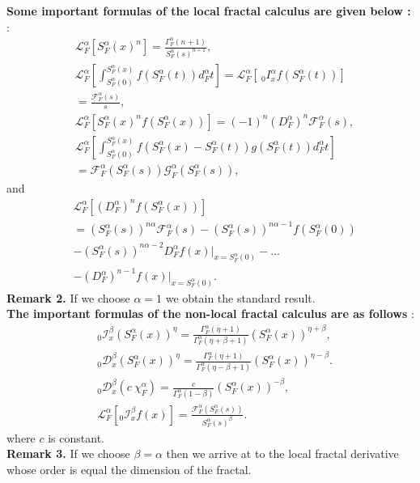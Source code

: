 \documentclass[12pt]{article}
\begin{document}
\textbf{Some important formulas of the local fractal calculus are given below :} \cite{ab12,Golmankhaneh-107-k}:
\begin{align}
& \mathcal{L}_{F}^{\alpha}[S_{F}^{\alpha}(x)^n ]= \frac{\Gamma_{F}^{\alpha}(n+1)}{S_{F}^{\alpha}(s)^{n+1}},\nonumber\\&
\mathcal{L}_{F}^{\alpha}\left[\int_{S_{F}^{\alpha}(0)}^{S_{F}^{\alpha}(x)}f(S_{F}^{\alpha}(t))d_{F}^{\alpha}t\right]=\mathcal{L}_{F}^{\alpha}
\left[~_{0}I_{x}^{\alpha}f(S_{F}^{\alpha}(t))\right]\nonumber\\& = \frac{\mathcal{F}_{F}^{\alpha}(s)}{s},\nonumber\\&
 \mathcal{L}_{F}^{\alpha}[S_{F}^{\alpha}(x)^n f(S_{F}^{\alpha}(x))]=(-1)^{n}(D_{F}^{\alpha})^{n}\mathcal{F}_{F}^{\alpha}(s),\nonumber\\&
 \mathcal{L}_{F}^{\alpha}\left[\int_{S_{F}^{\alpha}(0)}^{S_{F}^{\alpha}(x)}f(S_{F}^{\alpha}(x)-S_{F}^{\alpha}(t))g(S_{F}^{\alpha}(t))d_{F}^{\alpha}t\right]\nonumber\\&=
\mathcal{F}_{F}^{\alpha}(S_{F}^{\alpha}(s)) \mathcal{G}_{F}^{\alpha}(S_{F}^{\alpha}(s)),
\end{align}
and
 \begin{align}\label{vcxzd}
  & \mathcal{L}_{F}^{\alpha}[(D_{F}^{\alpha})^{n}f(S_{F}^{\alpha}(x))]\nonumber\\& = (S_{F}^{\alpha}(s))^{n\alpha}
\mathcal{F}_{F}^{\alpha}(s)-(S_{F}^{\alpha}(s))^{n\alpha-1}f(S_{F}^{\alpha}(0))\nonumber\\&-
(S_{F}^{\alpha}(s))^{n\alpha-2}D_{F}^{\alpha}f(x)|_{x=S_{F}^{\alpha}(0)}-\ldots\nonumber\\&-(D_{F}^{\alpha})^{n-1}f(x)|_{x=S_{F}^{\alpha}(0)}.
 \end{align}
 \textbf{Remark 2.} If we choose  $\alpha=1$ we obtain the standard result.\\
\textbf{The important formulas of the non-local fractal calculus are as follows } \cite{Golmankhaneh-107-k}:
\begin{align}
&  _{0}\mathcal{I}_{x}^{\beta}(S_{F}^{\alpha}(x))^{\eta}=\frac{\Gamma^{\alpha}_{F}(\eta+1)}
{\Gamma^{\alpha}_{F}(\eta+\beta+1)}(S_{F}^{\alpha}(x))^{\eta+\beta},\nonumber\\&
  _{0}\mathcal{D}_{x}^{\beta}(S_{F}^{\alpha}(x))^{\eta}=\frac{\Gamma^{\alpha}_{F}(\eta+1)}
{\Gamma^{\alpha}_{F}(\eta-\beta+1)}(S_{F}^{\alpha}(x))^{\eta-\beta}.\nonumber\\&
  _{0}\mathcal{D}_{x}^{\beta}(c~\chi_{F}^{\alpha})=\frac{c}
{\Gamma^{\alpha}_{F}(1-\beta)}(S_{F}^{\alpha}(x))^{-\beta},\nonumber\\&
\mathcal{L}_{F}^{\alpha}[ _{0}\mathcal{I}_{x}^{\beta}f(x)] = \frac{\mathcal{F}_{F}^{\alpha}(S_{F}^{\alpha}(s))}
{S_{F}^{\alpha}(s)^{\beta}}.
\end{align}
where $c$ is constant.\\
\textbf{Remark 3.} If we choose $\beta=\alpha$ then we arrive at to the local fractal  derivative whose order  is equal the dimension of the fractal.\\
\end{document}
